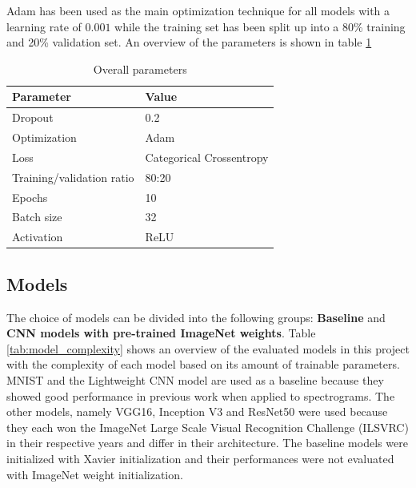 \documentclass{article}
\theoremstyle{definition}
\theoremstyle{remark}
\begin{document}
Adam \cite{kingma2014adam} has been used as the main optimization technique for all models with a learning rate of $0.001$ while the training set has been split up into a 80\% training and 20\% validation set. An overview of the parameters is shown in table \ref{tab:overall_parameters}


\begin{table}[h!]
\center
\begin{tabular}{|l|l|}
\hline
\textbf{Parameter} & \textbf{Value}  \\ \hline
Dropout & 0.2 \\ \hline
Optimization & Adam\\ \hline
Loss & Categorical Crossentropy \\ \hline
Training/validation ratio & 80:20\\ \hline
Epochs & 10 \\ \hline
Batch size & 32 \\ \hline
Activation & ReLU \\ \hline
\end{tabular}
\caption{Overall parameters}
\label{tab:overall_parameters}
\end{table}

\newpage


\subsection{Models} \label{models}

The choice of models can be divided into the following groups: \textbf{Baseline} and \textbf{CNN models with pre-trained ImageNet weights}. Table \ref{tab:model_complexity} shows an overview of the evaluated models in this project with the complexity of each model based on its amount of trainable parameters.\\
MNIST and the Lightweight CNN model are used as a baseline because they showed good performance in previous work when applied to spectrograms. The other models, namely VGG16, Inception V3 and ResNet50 were used because they each won the ImageNet Large Scale Visual Recognition Challenge (ILSVRC) in their respective years and differ in their architecture. The baseline models were initialized with Xavier initialization and their performances were not evaluated with ImageNet weight initialization.\\
\end{document}
